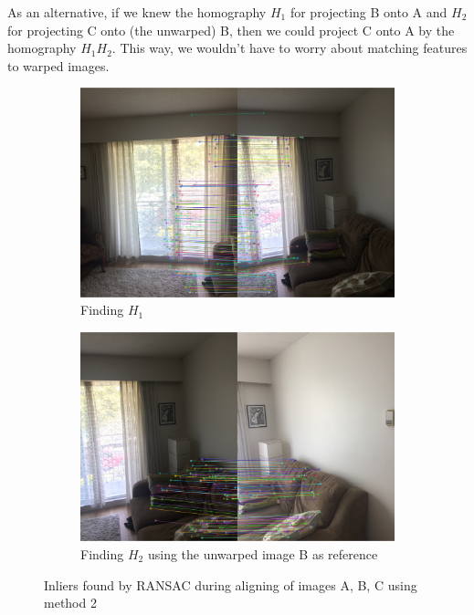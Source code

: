 \documentclass[]{article}
\begin{document}
As an alternative, if we knew the homography $H_1$ for projecting B onto A and $H_2$ for projecting C onto (the unwarped) B, then we could project C onto A by the homography $H_1H_2$. This way, we wouldn't have to worry about matching features to warped images.

\begin{figure}[h]
	\begin{subfigure}[h]{0.5\textwidth}
		\includegraphics[scale=0.35]{results/SIFT_indifference/method1/7}
		\centering
		\caption{Finding $H_1$}
	\end{subfigure}%
	\hfill
	\begin{subfigure}[h]{0.5\textwidth}
		\includegraphics[scale=0.35]{results/SIFT_indifference/method2/3}
		\centering
		\caption{Finding $H_2$ using the unwarped image B as reference}
	\end{subfigure}%
	\centering
	\caption{Inliers found by RANSAC during aligning of images A, B, C using method 2}
\end{figure}
\end{document}
